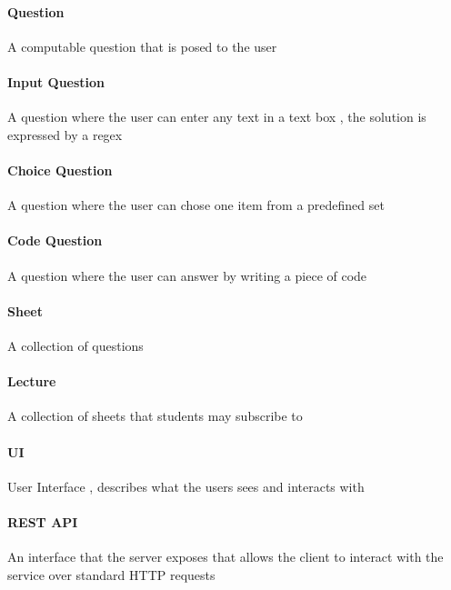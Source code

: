 \documentclass[12pt]{article}
\begin{document}
\paragraph{Question} A computable question that is posed to the user

\paragraph{Input Question} A question where the user can enter any text in a text box , the solution is expressed by a regex

\paragraph{Choice Question} A question where the user can chose one item from a predefined set

\paragraph{Code Question} A question where the user can answer by writing a piece of code

\paragraph{Sheet} A collection of questions

\paragraph{Lecture} A collection of sheets that students may subscribe to

\paragraph{UI} User Interface , describes what the users sees and interacts with

\paragraph{REST API} An interface that the server exposes that allows the client to interact with the service over standard HTTP requests

 
\end{document}
